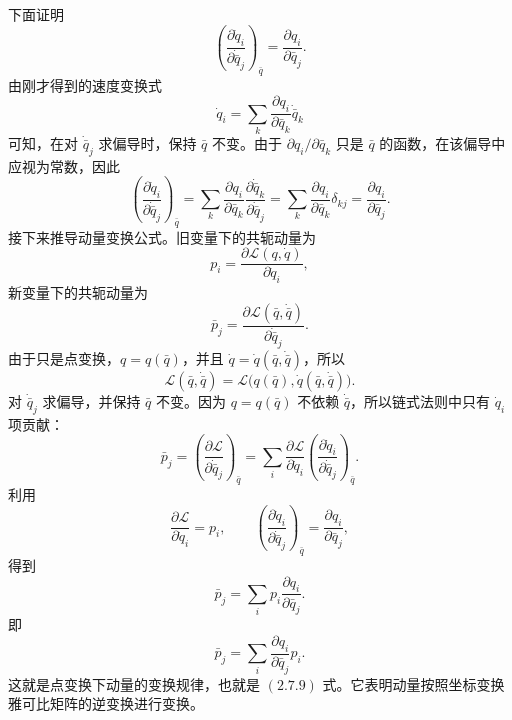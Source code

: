 \begin{solution}[正则变换中的动量变换]
下面证明
\[
\left(\frac{\partial \dot q_i}{\partial \dot{\bar q}_j}\right)_{\bar q}
=
\frac{\partial q_i}{\partial \bar q_j}.
\]
由刚才得到的速度变换式
\[
\dot q_i=\sum_k\frac{\partial q_i}{\partial \bar q_k}\dot{\bar q}_k
\]
可知，在对 \(\dot{\bar q}_j\) 求偏导时，保持 \(\bar q\) 不变。由于 \(\partial q_i/\partial \bar q_k\) 只是 \(\bar q\) 的函数，在该偏导中应视为常数，因此
\[
\left(\frac{\partial \dot q_i}{\partial \dot{\bar q}_j}\right)_{\bar q}
=
\sum_k\frac{\partial q_i}{\partial \bar q_k}
\frac{\partial \dot{\bar q}_k}{\partial \dot{\bar q}_j}
=
\sum_k\frac{\partial q_i}{\partial \bar q_k}\delta_{kj}
=
\frac{\partial q_i}{\partial \bar q_j}.
\]
接下来推导动量变换公式。旧变量下的共轭动量为
\[
p_i=\frac{\partial \mathcal L(q,\dot q)}{\partial \dot q_i},
\]
新变量下的共轭动量为
\[
\bar p_j=\frac{\partial \mathcal L(\bar q,\dot{\bar q})}{\partial \dot{\bar q}_j}.
\]
由于只是点变换，\(q=q(\bar q)\)，并且 \(\dot q=\dot q(\bar q,\dot{\bar q})\)，所以
\[
\mathcal L(\bar q,\dot{\bar q})
=
\mathcal L\bigl(q(\bar q),\dot q(\bar q,\dot{\bar q})\bigr).
\]
对 \(\dot{\bar q}_j\) 求偏导，并保持 \(\bar q\) 不变。因为 \(q=q(\bar q)\) 不依赖 \(\dot{\bar q}\)，所以链式法则中只有 \(\dot q_i\) 项贡献：
\[
\bar p_j
=
\left(\frac{\partial \mathcal L}{\partial \dot{\bar q}_j}\right)_{\bar q}
=
\sum_i
\frac{\partial \mathcal L}{\partial \dot q_i}
\left(\frac{\partial \dot q_i}{\partial \dot{\bar q}_j}\right)_{\bar q}.
\]
利用
\[
\frac{\partial \mathcal L}{\partial \dot q_i}=p_i,
\qquad
\left(\frac{\partial \dot q_i}{\partial \dot{\bar q}_j}\right)_{\bar q}
=
\frac{\partial q_i}{\partial \bar q_j},
\]
得到
\[
\bar p_j
=
\sum_i p_i\frac{\partial q_i}{\partial \bar q_j}.
\]
即
\[
\boxed{\bar p_j=\sum_i\frac{\partial q_i}{\partial \bar q_j}p_i.}
\]
这就是点变换下动量的变换规律，也就是 \((2.7.9)\) 式。它表明动量按照坐标变换雅可比矩阵的逆变换进行变换。


\end{solution}
